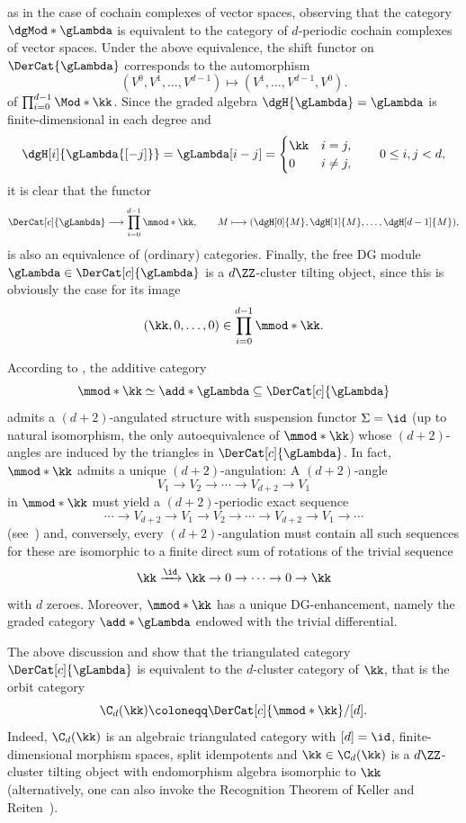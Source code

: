 \documentclass[a4paper]{amsart}
\begin{document}
as in the case of cochain complexes of vector spaces, observing that the
category $\dgMod*{\gLambda}$ is equivalent to the category of $d$-periodic
cochain complexes of vector spaces. Under the above equivalence, the shift
functor on $\DerCat{\gLambda}$ corresponds to the automorphism
\[
  (V^0,V^1,\dots,V^{d-1})\longmapsto(V^1,\dots,V^{d-1},V^0).
\]
of $\prod_{i=0}^{d-1}\Mod*{\kk}$. Since the graded algebra
$\dgH{\gLambda}=\gLambda$ is finite-dimensional in each degree and
\[
  \dgH[i]{\gLambda{[-j]}}=\gLambda[i-j]=\begin{cases}\kk&i=j,\\0&i\neq
    j,\end{cases}\qquad 0\leq i,j<d,
\]
it is clear that the functor
\[
  \DerCat[c]{\gLambda}\longrightarrow\prod_{i=0}^{d-1}\mmod*{\kk},\qquad
  M\longmapsto(\dgH[0]{M},\dgH[1]{M},\dots,\dgH[d-1]{M}),
\]
is also an equivalence of (ordinary) categories. Finally, the free DG module
${\gLambda\in\DerCat[c]{\gLambda}}$ is a $d\ZZ$-cluster tilting object, since
this is obviously the case for its image
\[
  (\kk,0,\dots,0)\in\prod_{i=0}^{d-1}\mmod*{\kk}.
\]

\begin{remark}
  \label{rmk:modk_unique_ang}
  According to , the additive category
  \[
    \mmod*{\kk}\simeq\add*{\gLambda}\subseteq\DerCat[c]{\gLambda}
  \]
  admits a $(d+2)$-angulated structure with suspension functor $\Sigma=\id$ (up
  to natural isomorphism, the only autoequivalence of $\mmod*{\kk}$) whose
  $(d+2)$-angles are induced by the triangles in $\DerCat[c]{\gLambda}$. In
  fact, $\mmod*{\kk}$ admits a unique $(d+2)$-angulation: A $(d+2)$-angle
  \[
    V_1\to V_2\to \cdots \to V_{d+2}\to V_1
  \]
  in $\mmod*{\kk}$ must yield a $(d+2)$-periodic exact sequence
  \[
    \cdots\to V_{d+2}\to V_1\to V_2\to \cdots\to V_{d+2}\to V_1\to \cdots
  \]
  (see~\cite[Prop.~2.5]{GKO13}) and, conversely, every $(d+2)$-angulation must
  contain all such sequences for these are isomorphic to a finite direct sum of
  rotations of the trivial sequence
  \[
    \kk\xrightarrow{\id}\kk\to0\to\cdots\to 0\to\kk
  \]
  with $d$ zeroes. Moreover, $\mmod*{\kk}$ has a unique DG-enhancement, namely the graded category $\add*{\gLambda}$ endowed with the trivial differential.
\end{remark}

\begin{remark}
  \label{rmk:is_cluster_cat_of_k}
  The above discussion and  show that the triangulated category $\DerCat[c]{\gLambda}$ is
  equivalent to the $d$-cluster category of $\kk$, that is the orbit
  category~\cite{Kel05}
  \[
    \C_d(\kk)\coloneqq\DerCat[c]{\mmod*{\kk}}/[d].
  \]
  Indeed, $\C_d(\kk)$ is an algebraic triangulated category with $[d]=\id$,
  finite-dimensional morphism spaces, split idempotents and $\kk\in\C_d(\kk)$ is a $d\ZZ$-cluster
  tilting object with endomorphism algebra isomorphic to $\kk$ (alternatively,
  one can also invoke the Recognition Theorem of Keller and Reiten~\cite{KR08}). 
\end{remark}
\end{document}
